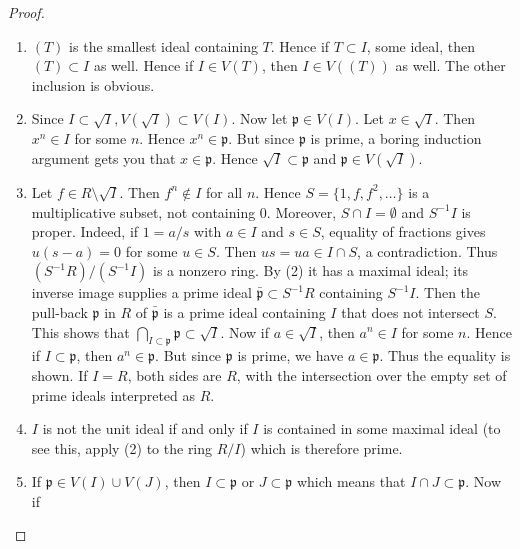 \begin{proof}
\begin{enumerate}
ideals contained in $\mathfrak{p}$ and containing $I$.
This collection is nonempty because it contains $\mathfrak p$,
which also supplies an upper bound for the empty chain in reverse inclusion.
For a nonempty chain its intersection still contains $I$, is contained
in $\mathfrak p$, and is prime by the argument in (3).
The resulting minimal member $\mathfrak q$ is minimal over $I$
among all primes: any prime between $I$ and $\mathfrak q$ also
lies inside $\mathfrak p$ and therefore belongs to the same collection.
\item $(T)$ is the smallest ideal containing $T$. Hence if $T \subset I$, some
ideal, then $(T) \subset I$ as well. Hence if $I \in V(T)$, then $I \in V((T))$
as well. The other inclusion is obvious.
\item Since $I \subset \sqrt{I}, V(\sqrt{I}) \subset V(I)$. Now let
$\mathfrak{p} \in V(I)$. Let $x \in \sqrt{I}$. Then $x^n \in I$ for some $n$.
Hence $x^n \in \mathfrak{p}$. But since $\mathfrak{p}$ is prime, a boring
induction argument gets you that $x \in \mathfrak{p}$. Hence $\sqrt{I} \subset
\mathfrak{p}$ and $\mathfrak{p} \in V(\sqrt{I})$.
\item Let $f \in R \setminus \sqrt{I}$. Then $f^n \notin I$ for all $n$. Hence
$S = \{1, f, f^2, \ldots\}$ is a multiplicative subset, not containing $0$.
Moreover, $S\cap I=\emptyset$ and $S^{-1}I$ is proper.
Indeed, if $1=a/s$ with $a\in I$ and $s\in S$, equality of fractions
gives $u(s-a)=0$ for some $u\in S$. Then $us=ua\in I\cap S$,
a contradiction. Thus $(S^{-1}R)/(S^{-1}I)$ is a nonzero ring.
By (2) it has a maximal ideal; its inverse image supplies a
prime ideal $\bar{\mathfrak{p}} \subset S^{-1}R$ containing $S^{-1}I$. Then the
pull-back $\mathfrak{p}$ in $R$ of $\bar{\mathfrak{p}}$ is a prime ideal
containing $I$ that does not intersect $S$. This shows that $\bigcap_{I \subset
\mathfrak p} \mathfrak p \subset \sqrt{I}$. Now if $a \in \sqrt{I}$, then $a^n
\in I$ for some $n$. Hence if $I \subset \mathfrak{p}$, then $a^n \in
\mathfrak{p}$. But since $\mathfrak{p}$ is prime, we have $a \in \mathfrak{p}$.
Thus the equality is shown. If $I=R$, both sides are $R$,
with the intersection over the empty set of prime ideals interpreted as $R$.
\item $I$ is not the unit ideal if and only if $I$
is contained in some maximal ideal (to
see this, apply (2) to the ring $R/I$) which is therefore prime.
\item If $\mathfrak{p} \in V(I) \cup V(J)$, then $I \subset \mathfrak{p}$ or $J
\subset \mathfrak{p}$ which means that $I \cap J \subset \mathfrak{p}$. Now if

\end{enumerate}
\end{proof}
